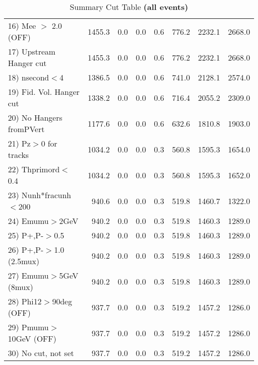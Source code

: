 \begin{table}[h!]
{{\begin{tabular}{||l||r|r|r|r|r||r||r||}
 16) Mee $>$ 2.0  (OFF)   &    1455.3 &       0.0 &       0.0 &       0.6 &     776.2 &    2232.1 &    2668.0 \\
 17) Upstream Hanger cut  &    1455.3 &       0.0 &       0.0 &       0.6 &     776.2 &    2232.1 &    2668.0 \\
 18) nsecond$<$4          &    1386.5 &       0.0 &       0.0 &       0.6 &     741.0 &    2128.1 &    2574.0 \\
 19) Fid. Vol. Hanger cut &    1338.2 &       0.0 &       0.0 &       0.6 &     716.4 &    2055.2 &    2309.0 \\
 20) No Hangers fromPVert &    1177.6 &       0.0 &       0.0 &       0.6 &     632.6 &    1810.8 &    1903.0 \\
 21) Pz$>$0 for tracks    &    1034.2 &       0.0 &       0.0 &       0.3 &     560.8 &    1595.3 &    1654.0 \\
 22) Thprimord$<$0.4      &    1034.2 &       0.0 &       0.0 &       0.3 &     560.8 &    1595.3 &    1652.0 \\
 23) Nunh*fracunh$<$200   &     940.6 &       0.0 &       0.0 &       0.3 &     519.8 &    1460.7 &    1322.0 \\
 24) Emumu$>$2GeV         &     940.2 &       0.0 &       0.0 &       0.3 &     519.8 &    1460.3 &    1289.0 \\
 25) P+,P-$>$0.5          &     940.2 &       0.0 &       0.0 &       0.3 &     519.8 &    1460.3 &    1289.0 \\
 26) P+,P-$>$1.0 (2.5mux) &     940.2 &       0.0 &       0.0 &       0.3 &     519.8 &    1460.3 &    1289.0 \\
 27) Emumu$>$5GeV  (8mux) &     940.2 &       0.0 &       0.0 &       0.3 &     519.8 &    1460.3 &    1289.0 \\
 28) Phi12$>$90deg  (OFF) &     937.7 &       0.0 &       0.0 &       0.3 &     519.2 &    1457.2 &    1286.0 \\
 29) Pmumu$>$10GeV  (OFF) &     937.7 &       0.0 &       0.0 &       0.3 &     519.2 &    1457.2 &    1286.0 \\
 30) No cut, not set      &     937.7 &       0.0 &       0.0 &       0.3 &     519.2 &    1457.2 &    1286.0 \\
 \hline
 \hline
 \end{tabular}
 \caption{Summary Cut Table \textbf{ (all events)}}
 \label{tab-sumcut}
 }}
 \end{table}
 \endinput
